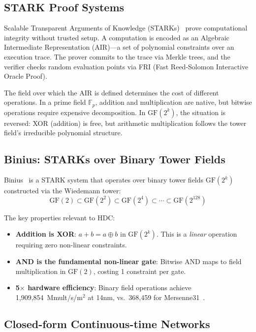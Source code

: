 \documentclass[11pt,twocolumn]{article}
\begin{document}
\subsection{STARK Proof Systems}

Scalable Transparent Arguments of Knowledge (STARKs)~\cite{ben2018scalable} prove computational integrity without trusted setup. A computation is encoded as an Algebraic Intermediate Representation (AIR)---a set of polynomial constraints over an execution trace. The prover commits to the trace via Merkle trees, and the verifier checks random evaluation points via FRI (Fast Reed-Solomon Interactive Oracle Proof).

The field over which the AIR is defined determines the cost of different operations. In a prime field $\mathbb{F}_p$, addition and multiplication are native, but bitwise operations require expensive decomposition. In $\mathrm{GF}(2^k)$, the situation is reversed: XOR (addition) is free, but arithmetic multiplication follows the tower field's irreducible polynomial structure.

\subsection{Binius: STARKs over Binary Tower Fields}

Binius~\cite{diamond2023binius} is a STARK system that operates over binary tower fields $\mathrm{GF}(2^k)$ constructed via the Wiedemann tower:
$$\mathrm{GF}(2) \subset \mathrm{GF}(2^2) \subset \mathrm{GF}(2^4) \subset \cdots \subset \mathrm{GF}(2^{128})$$

The key properties relevant to HDC:
\begin{itemize}
    \item \textbf{Addition is XOR}: $a + b = a \oplus b$ in $\mathrm{GF}(2^k)$. This is a \emph{linear} operation requiring zero non-linear constraints.
    \item \textbf{AND is the fundamental non-linear gate}: Bitwise AND maps to field multiplication in $\mathrm{GF}(2)$, costing 1 constraint per gate.
    \item \textbf{5$\times$ hardware efficiency}: Binary field operations achieve 1,909,854~Mmult/s/\textmu m$^2$ at 14nm, vs.\ 368,459 for Mersenne31~\cite{diamond2023binius}.
\end{itemize}

\subsection{Closed-form Continuous-time Networks}
\end{document}
